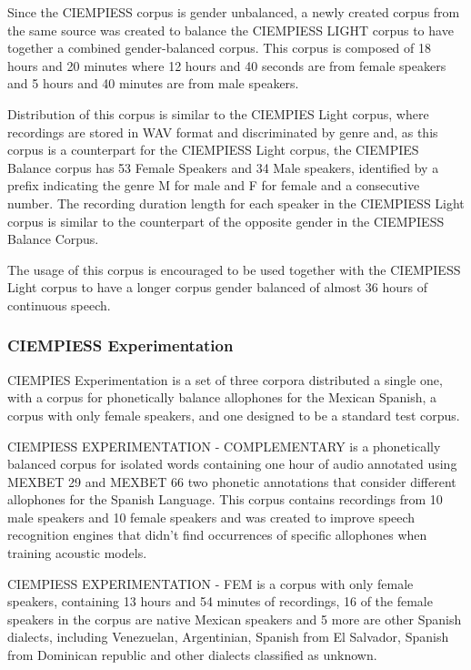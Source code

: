 \documentclass[10pt, a4paper]{article}
\begin{document}
Since the CIEMPIESS corpus is gender unbalanced, a newly created corpus from the same source was created to balance the CIEMPIESS LIGHT corpus to have together a combined gender-balanced corpus. This corpus is composed of 18 hours and 20 minutes where 12 hours and 40 seconds are from female speakers and 5 hours and 40 minutes are from male speakers.

Distribution of this corpus is similar to the CIEMPIES Light corpus, where recordings are stored in WAV format and discriminated by genre and, as this corpus is a counterpart for the CIEMPIESS Light corpus, the CIEMPIES Balance corpus has 53 Female Speakers and 34 Male speakers, identified by a prefix indicating the genre M for male and F for female and a consecutive number. The recording duration length for each speaker in the CIEMPIESS Light corpus is similar to the counterpart of the opposite gender in the CIEMPIESS Balance Corpus.

The usage of this corpus is encouraged to be used together with the CIEMPIESS Light corpus to have a longer corpus gender balanced of almost 36 hours of continuous speech.

\subsubsection{CIEMPIESS Experimentation}

CIEMPIES Experimentation is a set of three corpora distributed a single one, with a corpus for phonetically balance allophones for the Mexican Spanish, a corpus with only female speakers, and one designed to be a standard test corpus.

CIEMPIESS EXPERIMENTATION - COMPLEMENTARY is a phonetically balanced corpus for isolated words containing one hour of audio annotated using MEXBET 29 and MEXBET 66 two phonetic annotations that consider different allophones for the Spanish Language. This corpus contains recordings from 10 male speakers and 10 female speakers and was created to improve speech recognition engines that didn't find occurrences of specific allophones when training acoustic models.

CIEMPIESS EXPERIMENTATION - FEM is a corpus with only female speakers, containing 13 hours and 54 minutes of recordings, 16 of the female speakers in the corpus are native Mexican speakers and 5 more are other Spanish dialects, including Venezuelan, Argentinian, Spanish from El Salvador, Spanish from Dominican republic and other dialects classified as unknown.
\end{document}

